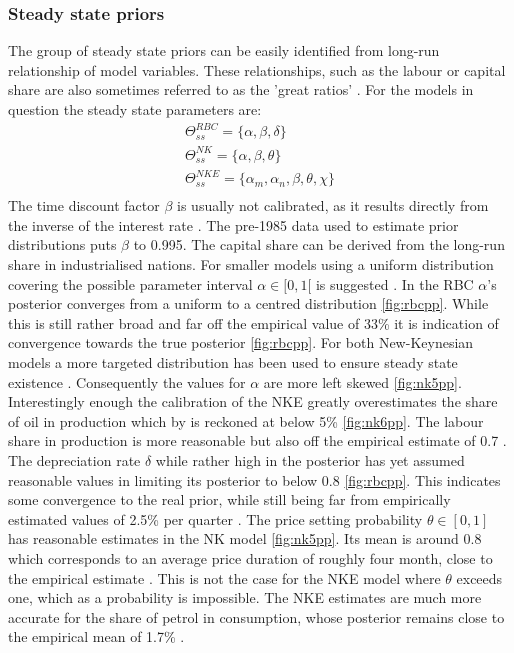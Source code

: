 \documentclass[12pt,a4paper,english]{article} %
\begin{document}
	\subsubsection{Steady state priors}
	The group of steady state priors can be easily identified from long-run relationship of model variables. These relationships, such as the labour or capital share are also sometimes referred to as the 'great ratios' \cite{kydland_time_1982}. For the models in question the steady state parameters are: 
	\begin{equation}
		\begin{aligned}
			\Theta_{ss}^{RBC} = \{ \alpha, \beta, \delta \} \\
			\Theta_{ss}^{NK} = \{\alpha, \beta, \theta \} \\
			\Theta_{ss}^{NKE} = \{\alpha_m, \alpha_n, \beta, \theta, \chi \} \\
		\end{aligned}
	\end{equation}
	The time discount factor $\beta$ is usually not calibrated, as it results directly from the inverse of the interest rate \cite{guerron-quintana_bayesian_2013}. The pre-1985 data used to estimate prior distributions puts $\beta$ to 0.995.	
	The capital share can be derived from the long-run share in industrialised nations. For smaller models using a uniform distribution covering the possible parameter interval $\alpha \in [0,1[$ is suggested \cite{del_negro_forming_2008}. In the RBC $\alpha$'s posterior converges from a uniform to a centred distribution \ref{fig:rbcpp}. While this is still rather broad and far off the empirical value of 33\% it is indication of convergence towards the true posterior \ref{fig:rbcpp}.
	For both New-Keynesian models a more targeted distribution has been used to ensure steady state existence \cite{guerron-quintana_bayesian_2013}. Consequently the values for $\alpha$ are more left skewed \ref{fig:nk5pp}. Interestingly enough the calibration of the NKE greatly overestimates the share of oil in production which by \cite{blanchard_macroeconomic_2007} is reckoned at below 5\% \ref{fig:nk6pp}. The labour share in production is more reasonable but also off the empirical estimate of 0.7 \cite{blanchard_macroeconomic_2007}.
	The depreciation rate $\delta$ while rather high in the posterior has yet assumed reasonable values in limiting its posterior to below 0.8 \ref{fig:rbcpp}. This indicates some convergence to the real prior, while still being far from empirically estimated values of 2.5\% per quarter \cite{campbell_inspecting_1994}.
	The price setting probability $\theta \in [0,1]$ has reasonable estimates in the NK model \ref{fig:nk5pp}. Its mean is around 0.8 which corresponds to an average price duration of roughly four month, close to the empirical estimate \cite{blanchard_macroeconomic_2007}. This is not the case for the NKE model where $\theta$ exceeds one, which as a probability is impossible. The NKE estimates are much more accurate for the share of petrol in consumption, whose posterior remains close to the empirical mean of 1.7\% \cite{blanchard_macroeconomic_2007}.
\end{document}
